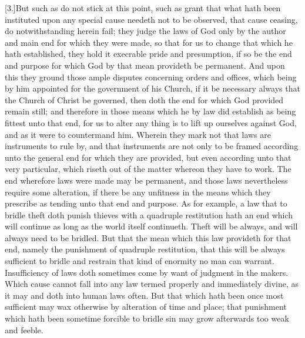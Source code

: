 [3.]But such as do not stick at this point, such as grant that what hath been instituted upon any special cause needeth not to be observed, that cause ceasing, do notwithstanding herein fail; they judge the laws of God only by the author and main end for which they were made, so that for us to change that which he hath established, they hold it execrable pride and presumption, if so be the end and purpose for which God by that mean provideth be permanent. And upon this they ground those ample disputes concerning orders and offices, which being by him appointed for the government of his Church, if it be necessary always that the Church of Christ be governed, then doth the end for which God provided remain still; and therefore in those means which he by law did establish as being fittest unto that end, for us to alter any thing is to lift up ourselves against God, and as it were to countermand him. Wherein they mark not that laws are instruments to rule by, and that instruments are not only to be framed according unto the general end for which they are provided, but even according unto that very particular, which riseth out of the matter whereon they have to work.  The end wherefore laws were made may be permanent, and those laws nevertheless require some alteration, if there be any unfitness in the means which they prescribe as tending unto that end and purpose. As for example, a law that to bridle theft doth punish thieves with a quadruple restitution hath an end which will continue as long as the world itself continueth. Theft will be always, and will always need to be bridled. But that the mean which this law provideth for that end, namely the punishment of quadruple restitution, that this will be always sufficient to bridle and restrain that kind of enormity no man can warrant. Insufficiency of laws doth sometimes come by want of judgment in the makers. Which cause cannot fall into any law termed properly and immediately divine, as it may and doth into human laws often. But that which hath been once most sufficient may wax otherwise by alteration of time and place; that punishment which hath been sometime forcible to bridle sin may grow afterwards too weak and feeble.


